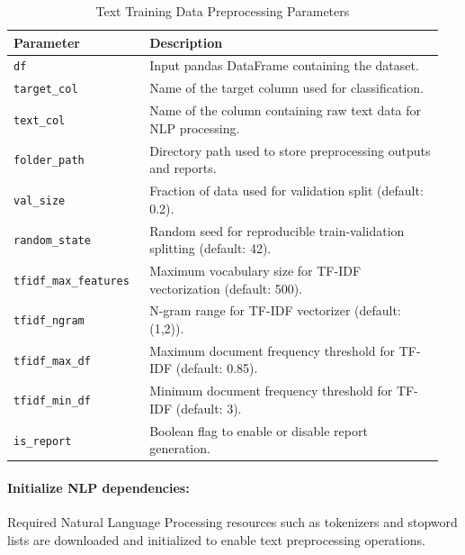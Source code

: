 \begin{table}[!htbp]
\centering
\caption{Text Training Data Preprocessing Parameters }
\label{tab:text_constructor_params}

\begin{tabular}{p{0.30\linewidth}p{0.65\linewidth}}
\toprule
\textbf{Parameter} & \textbf{Description} \\
\midrule

\texttt{df} &
Input pandas DataFrame containing the dataset. \\

\texttt{target\_col} &
Name of the target column used for classification. \\

\texttt{text\_col} &
Name of the column containing raw text data for NLP processing. \\

\texttt{folder\_path} &
Directory path used to store preprocessing outputs and reports. \\

\texttt{val\_size} &
Fraction of data used for validation split (default: 0.2). \\

\texttt{random\_state} &
Random seed for reproducible train-validation splitting (default: 42). \\

\texttt{tfidf\_max\_features} &
Maximum vocabulary size for TF-IDF vectorization (default: 500). \\

\texttt{tfidf\_ngram} &
N-gram range for TF-IDF vectorizer (default: (1,2)). \\

\texttt{tfidf\_max\_df} &
Maximum document frequency threshold for TF-IDF (default: 0.85). \\

\texttt{tfidf\_min\_df} &
Minimum document frequency threshold for TF-IDF (default: 3). \\

\texttt{is\_report} &
Boolean flag to enable or disable report generation. \\

\bottomrule
\end{tabular}
\end{table}
\vspace{1cm}

\paragraph{Initialize NLP dependencies:}\par
Required Natural Language Processing resources such as tokenizers and stopword lists are downloaded and initialized to enable text preprocessing operations.
\vspace{1cm}

